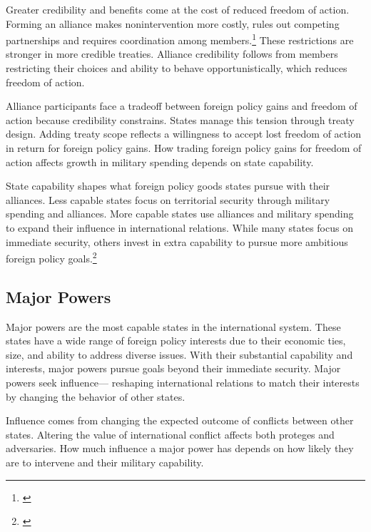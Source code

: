 \documentclass[12pt]{article}
\begin{document}
Greater credibility and benefits come at the cost of reduced freedom of action.
Forming an alliance makes nonintervention more costly, rules out competing partnerships and requires coordination among members.\footnote{\cite{Snyder1997}}
These restrictions are stronger in more credible treaties.
Alliance credibility follows from members restricting their choices and ability to behave opportunistically, which reduces freedom of action. 



Alliance participants face a tradeoff between foreign policy gains and freedom of action because credibility constrains. 
States manage this tension through treaty design. 
Adding treaty scope reflects a willingness to accept lost freedom of action in return for foreign policy gains. 
How trading foreign policy gains for freedom of action affects growth in military spending depends on state capability. 


State capability shapes what foreign policy goods states pursue with their alliances. 
Less capable states focus on territorial security through military spending and alliances. 
More capable states use alliances and military spending to expand their influence in international relations. 
While many states focus on immediate security, others invest in extra capability to pursue more ambitious foreign policy goals.\footnote{\cite{Fordham2011, MarkowitzFariss2017}} 


\subsection{Major Powers} 


Major powers are the most capable states in the international system. 
These states have a wide range of foreign policy interests due to their economic ties, size, and ability to address diverse issues. 
With their substantial capability and interests, major powers pursue goals beyond their immediate security. 
Major powers seek influence--- reshaping international relations to match their interests by changing the behavior of other states. 


Influence comes from changing the expected outcome of conflicts between other states.
Altering the value of international conflict affects both proteges and adversaries.  
How much influence a major power has depends on how likely they are to intervene and their military capability. 
\end{document}
